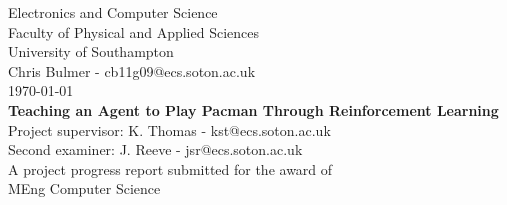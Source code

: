 \begin{titlepage}
\vspace*{\fill} %
\begin{center}

{\LARGE Electronics and Computer Science} \\ [0.3cm]
{\LARGE Faculty of Physical and Applied Sciences} \\ [0.3cm]
{\LARGE University of Southampton} \\ [1cm]

{\LARGE Chris Bulmer - cb11g09@ecs.soton.ac.uk} \\ [0.3cm]
{\LARGE \today} \\ [1.5cm]

\textbf{\LARGE Teaching an Agent to Play Pacman Through Reinforcement Learning} \\ [1.5cm]

{\LARGE Project supervisor: K. Thomas - kst@ecs.soton.ac.uk} \\ [0.3cm]
{\LARGE Second examiner: J. Reeve - jsr@ecs.soton.ac.uk} \\ [1cm]

{\LARGE A project progress report submitted for the award of} \\ [0.3cm]
{\LARGE MEng Computer Science}

\end{center}
\vspace*{\fill}
\end{titlepage}